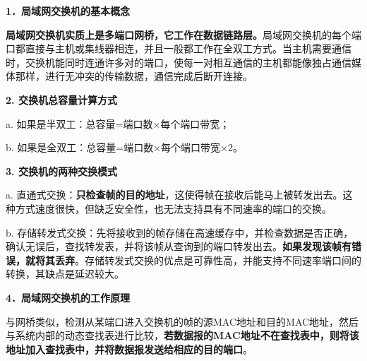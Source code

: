 \textbf{{1．局域网交换机的基本概念}}

\textbf{局域网交换机实质上是多端口网桥，它工作在数据链路层。}局域网交换机的每个端口都直接与主机或集线器相连，并且一般都工作在全双工方式。当主机需要通信时，交换机能同时连通许多对的端口，使每一对相互通信的主机都能像独占通信媒体那样，进行无冲突的传输数据，通信完成后断开连接。

\textbf{{2. 交换机总容量计算方式}}

a. 如果是半双工：总容量=端口数×每个端口带宽；

b. 如果是全双工：总容量=端口数×每个端口带宽×2。

\textbf{{3. 交换机的两种交换模式}}

a.
直通式交换：\textbf{只检查帧的目的地址}，这使得帧在接收后能马上被转发出去。这种方式速度很快，但缺乏安全性，也无法支持具有不同速率的端口的交换。

b.
存储转发式交换：先将接收到的帧存储在高速缓存中，并检查数据是否正确，确认无误后，查找转发表，并将该帧从查询到的端口转发出去。\textbf{{如果发现该帧有错误，就将其丢弃}}。存储转发式交换的优点是可靠性高，并能支持不同速率端口间的转换，其缺点是延迟较大。

\textbf{{4．局域网交换机的工作原理}}

与网桥类似，检测从某端口进入交换机的帧的源MAC地址和目的MAC地址，然后与系统内部的动态查找表进行比较，{\textbf{若数据报的MAC地址不在查找表中，则将该地址加入查找表中，并将数据报发送给相应的目的端口}}。
